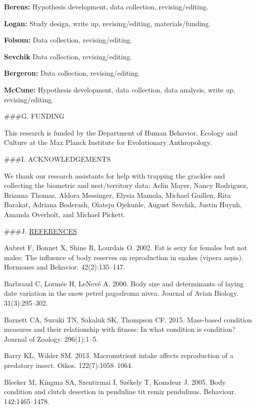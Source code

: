 \documentclass[
]{article}
\begin{document}
\textbf{Berens:} Hypothesis development, data collection,
revising/editing.

\textbf{Logan:} Study design, write up, revising/editing,
materials/funding.

\textbf{Folsom:} Data collection, revising/editing.

\textbf{Sevchik} Data collection, revising/editing.

\textbf{Bergeron:} Data collection, revising/editing.

\textbf{McCune:} Hypothesis development, data collection, data analysis,
write up, revising/editing.

\#\#\#G. FUNDING

This research is funded by the Department of Human Behavior, Ecology and
Culture at the Max Planck Institute for Evolutionary Anthropology.

\#\#\#I. ACKNOWLEDGEMENTS

We thank our research assistants for help with trapping the grackles and
collecting the biometric and nest/territory data: Aelin Mayer, Nancy
Rodriguez, Brianna Thomas, Aldora Messinger, Elysia Mamola, Michael
Guillen, Rita Barakat, Adriana Boderash, Olateju Ojekunle, August
Sevchik, Justin Huynh, Amanda Overholt, and Michael Pickett.

\#\#\#J. \href{MyLibrary.bib}{REFERENCES}

\hypertarget{refs}{}
\leavevmode\hypertarget{ref-aubret2002fat}{}%
Aubret F, Bonnet X, Shine R, Lourdais O. 2002. Fat is sexy for females
but not males: The influence of body reserves on reproduction in snakes
(vipera aspis). Hormones and Behavior. 42(2):135--147.

\leavevmode\hypertarget{ref-barbraud2000body}{}%
Barbraud C, Lormée H, LeNevé A. 2000. Body size and determinants of
laying date variation in the snow petrel pagodroma nivea. Journal of
Avian Biology. 31(3):295--302.

\leavevmode\hypertarget{ref-barnett2015mass}{}%
Barnett CA, Suzuki TN, Sakaluk SK, Thompson CF. 2015. Mass-based
condition measures and their relationship with fitness: In what
condition is condition? Journal of Zoology. 296(1):1--5.

\leavevmode\hypertarget{ref-barry2013macronutrient}{}%
Barry KL, Wilder SM. 2013. Macronutrient intake affects reproduction of
a predatory insect. Oikos. 122(7):1058--1064.

\leavevmode\hypertarget{ref-bleeker2005body}{}%
Bleeker M, Kingma SA, Szentirmai I, Székely T, Komdeur J. 2005. Body
condition and clutch desertion in penduline tit remiz pendulinus.
Behaviour. 142:1465--1478.
\end{document}
